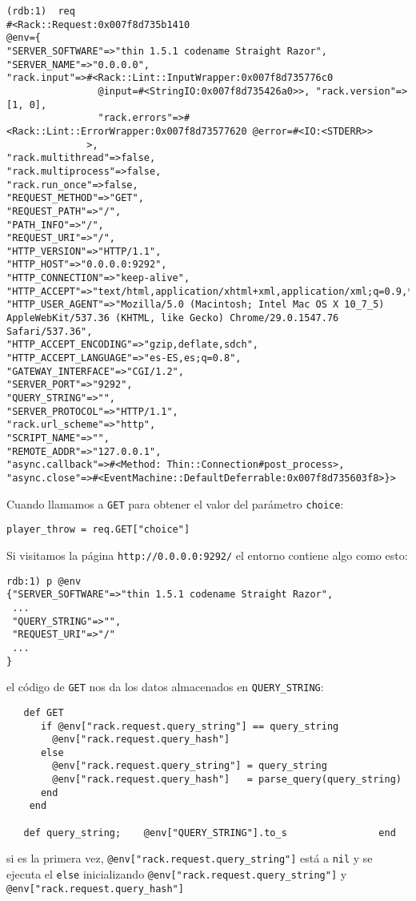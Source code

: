 \begin{verbatim}
(rdb:1)  req
#<Rack::Request:0x007f8d735b1410 
@env={
"SERVER_SOFTWARE"=>"thin 1.5.1 codename Straight Razor", 
"SERVER_NAME"=>"0.0.0.0", 
"rack.input"=>#<Rack::Lint::InputWrapper:0x007f8d735776c0 
                @input=#<StringIO:0x007f8d735426a0>>, "rack.version"=>[1, 0], 
                "rack.errors"=>#<Rack::Lint::ErrorWrapper:0x007f8d73577620 @error=#<IO:<STDERR>>
              >, 
"rack.multithread"=>false, 
"rack.multiprocess"=>false, 
"rack.run_once"=>false, 
"REQUEST_METHOD"=>"GET", 
"REQUEST_PATH"=>"/", 
"PATH_INFO"=>"/", 
"REQUEST_URI"=>"/", 
"HTTP_VERSION"=>"HTTP/1.1", 
"HTTP_HOST"=>"0.0.0.0:9292", 
"HTTP_CONNECTION"=>"keep-alive", 
"HTTP_ACCEPT"=>"text/html,application/xhtml+xml,application/xml;q=0.9,*/*;q=0.8", 
"HTTP_USER_AGENT"=>"Mozilla/5.0 (Macintosh; Intel Mac OS X 10_7_5) AppleWebKit/537.36 (KHTML, like Gecko) Chrome/29.0.1547.76 Safari/537.36", 
"HTTP_ACCEPT_ENCODING"=>"gzip,deflate,sdch", 
"HTTP_ACCEPT_LANGUAGE"=>"es-ES,es;q=0.8", 
"GATEWAY_INTERFACE"=>"CGI/1.2", 
"SERVER_PORT"=>"9292", 
"QUERY_STRING"=>"", 
"SERVER_PROTOCOL"=>"HTTP/1.1", 
"rack.url_scheme"=>"http", 
"SCRIPT_NAME"=>"", 
"REMOTE_ADDR"=>"127.0.0.1", 
"async.callback"=>#<Method: Thin::Connection#post_process>, 
"async.close"=>#<EventMachine::DefaultDeferrable:0x007f8d735603f8>}>
\end{verbatim}
Cuando llamamos a \verb|GET| para obtener el valor del parámetro \verb|choice|:
\begin{verbatim}
player_throw = req.GET["choice"]
\end{verbatim}
Si visitamos la página \verb|http://0.0.0.0:9292/| el entorno contiene algo como esto:
\begin{verbatim}
rdb:1) p @env
{"SERVER_SOFTWARE"=>"thin 1.5.1 codename Straight Razor",
 ...
 "QUERY_STRING"=>"",
 "REQUEST_URI"=>"/"
 ...
}
\end{verbatim}
el código de \verb|GET| nos da los datos almacenados en \verb|QUERY_STRING|:
\begin{verbatim}
   def GET 
      if @env["rack.request.query_string"] == query_string
        @env["rack.request.query_hash"]
      else
        @env["rack.request.query_string"] = query_string
        @env["rack.request.query_hash"]   = parse_query(query_string)
      end 
    end 

   def query_string;    @env["QUERY_STRING"].to_s                end
\end{verbatim}
si es la primera vez, \verb|@env["rack.request.query_string"]| está a 
\verb|nil| y se ejecuta el \verb|else| inicializando \verb|@env["rack.request.query_string"]|
y \verb|@env["rack.request.query_hash"]|

